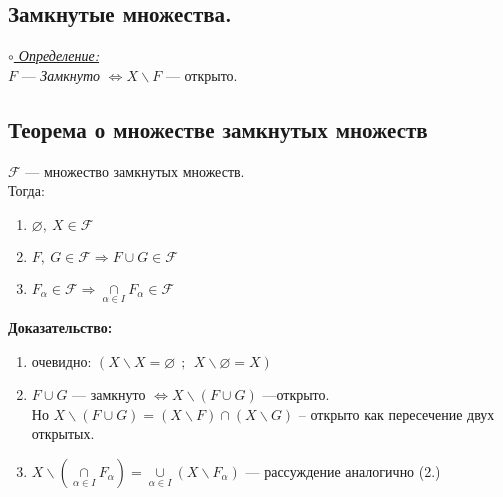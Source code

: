 \documentclass{article}
\begin{document}
\begin{spacing}{1.5}
  \section{Замкнутые множества.}
\underline{\textit{$\circ$ Определение:}}\\
$F$ --- \emph{Замкнуто} $\Longleftrightarrow X\backslash F$ --- открыто.
\subsection{Теорема о множестве замкнутых множеств}
$ \mathcal{F} $ --- множество замкнутых множеств.
\\Тогда:
\begin{enumerate}
\item $\varnothing ,~X\in \mathcal{F}$
\item $F,~G\in \mathcal{F} \Longrightarrow F\cup G\in \mathcal{F}$
\item $F_{\alpha}\in \mathcal{F} \Longrightarrow \underset{\alpha\in I}{\cap}F_{\alpha}\in \mathcal{F}$
\end{enumerate}
 \textbf{Доказательство:}
 \begin{enumerate}
 	\item очевидно: $(X\backslash X = \varnothing~~;~~X\backslash \varnothing = X)$
 	\item $F\cup G$ --- замкнуто $\Longleftrightarrow X\backslash (F\cup G)$ ---открыто.\\
 	Но $X\backslash (F\cup G) = (X\backslash F)\cap(X\backslash G)$ -- открыто как пересечение двух открытых.
 	\item $X\backslash(\underset{\alpha\in I}{\cap}F_{\alpha}) = \underset{\alpha\in I}{\cup}(X\backslash F_{\alpha})$ --- рассуждение аналогично (2.)

\end{enumerate}

\end{spacing}
\end{document}
